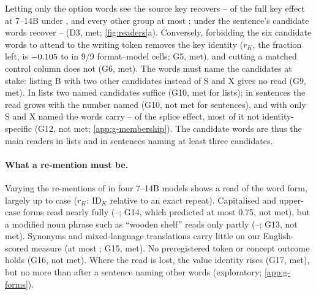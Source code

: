 Letting only the option words see the source key recovers \locScaleOptMin{}--\locScaleOptMax{} of the full key effect at 7--14B under \fmtOpt{}, and every other group at most \locScaleOptOtherMax{}; under \fmtPost{} the sentence's candidate words recover \locScalePostMin{}--\locScalePostMax{} (D3, met; \cref{fig:readers}a). Conversely, forbidding the six candidate words to attend to the writing token removes the key identity ($r_K$, the fraction left, is $-0.105$ to \GfiveRKMax{} in 9/9 format--model cells; G5, met), and cutting a matched control column does not (G6, met). The words must name the candidates at stake: listing B with two other candidates instead of S and X gives no read (G9, met). In lists two named candidates suffice (G10, met for lists); in sentences the read grows with the number named (G10, not met for sentences), and with only S and X named the words carry \GtwelveStwoQwenFourteen{}--\GtwelveStwoQwenSeven{} of the splice effect, most of it not identity-specific (G12, not met; \cref{app:g-membership}). The candidate words are thus the main readers in lists and in sentences naming at least three candidates.

\paragraph{What a re-mention must be.} Varying the re-mentions of \fmtPost{} in four 7--14B models shows a read of the word form, largely up to case ($r_K$: $\mathrm{ID}_K$ relative to an exact repeat). Capitalised and upper-case forms read nearly fully (\GfourteenCaseMin{}--\GfourteenCaseMax{}; G14, which predicted at most 0.75, not met), but a modified noun phrase such as ``wooden shelf'' reads only partly (\GthirteenModifMin{}--\GthirteenModifMax{}; G13, not met). Synonyms and mixed-language translations carry little on our English-scored measure (at most \GfifteenRKMax{}; G15, met). No preregistered token or concept outcome holds (G16, not met). Where the read is lost, the value identity rises (G17, met), but no more than after a sentence naming other words (exploratory; \cref{app:g-forms}).

